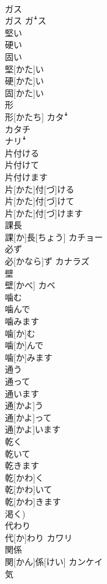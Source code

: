 \documentclass[8pt]{extreport}
\begin{document}
\begin{CJK}{UTF8}{min}
\\	ガス	
\\	ガス	ガꜜス
\\	堅い 
\\	硬い 
\\	固い	
\\	堅[かた]い 
\\	硬[かた]い 
\\	固[かた]い	
\\	形	
\\	形[かたち]	カタꜜ 
\\	カタチ 
\\	ナリꜜ
\\	片付ける 
\\	片付けて 
\\	片付けます	
\\	片[かた]付[づ]ける 
\\	片[かた]付[づ]けて 
\\	片[かた]付[づ]けます	
\\	課長	
\\	課[か]長[ちょう]	カチョー
\\	必ず	
\\	必[かなら]ず	カナラズ
\\	壁	
\\	壁[かべ]	カベ
\\	噛む 
\\	噛んで 
\\	噛みます	
\\	噛[か]む 
\\	噛[か]んで 
\\	噛[か]みます	
\\	通う 
\\	通って 
\\	通います	
\\	通[かよ]う 
\\	通[かよ]って 
\\	通[かよ]います	
\\	乾く 
\\	乾いて 
\\	乾きます	
\\	乾[かわ]く 
\\	乾[かわ]いて 
\\	乾[かわ]きます 
\\	渇く)	
\\	代わり	
\\	代[か]わり	カワリ
\\	関係	
\\	関[かん]係[けい]	カンケイ
\\	気	

\end{CJK}
\end{document}
